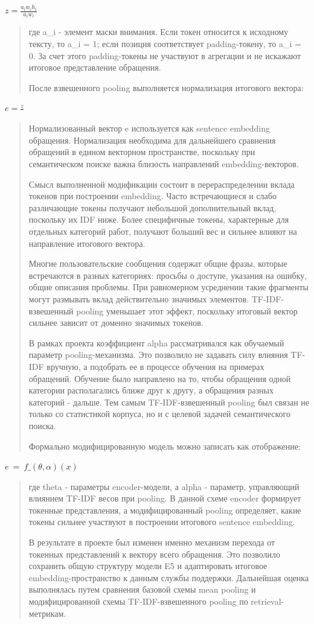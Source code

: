 \documentclass[
]{article}
\begin{document}
\(z = \frac{a_{i}w_{i}h_{i}}{a_{i}w_{i}}\)

\begin{quote}
где a\_i - элемент маски внимания. Если токен относится к исходному
тексту, то a\_i = 1; если позиция соответствует padding-токену, то a\_i
= 0. За счет этого padding-токены не участвуют в агрегации и не искажают
итоговое представление обращения.

После взвешенного pooling выполняется нормализация итогового вектора:
\end{quote}

\(e = \frac{z}{}\)

\begin{quote}
Нормализованный вектор e используется как sentence embedding обращения.
Нормализация необходима для дальнейшего сравнения обращений в едином
векторном пространстве, поскольку при семантическом поиске важна
близость направлений embedding-векторов.

Смысл выполненной модификации состоит в перераспределении вклада токенов
при построении embedding. Часто встречающиеся и слабо различающие токены
получают небольшой дополнительный вклад, поскольку их IDF ниже. Более
специфичные токены, характерные для отдельных категорий работ, получают
больший вес и сильнее влияют на направление итогового вектора.

Многие пользовательские сообщения содержат общие фразы, которые
встречаются в разных категориях: просьбы о доступе, указания на ошибку,
общие описания проблемы. При равномерном усреднении такие фрагменты
могут размывать вклад действительно значимых элементов.
TF-IDF-взвешенный pooling уменьшает этот эффект, поскольку итоговый
вектор сильнее зависит от доменно значимых токенов.

В рамках проекта коэффициент alpha рассматривался как обучаемый параметр
pooling-механизма. Это позволило не задавать силу влияния TF-IDF
вручную, а подобрать ее в процессе обучения на примерах обращений.
Обучение было направлено на то, чтобы обращения одной категории
располагались ближе друг к другу, а обращения разных категорий - дальше.
Тем самым TF-IDF-взвешенный pooling был связан не только со статистикой
корпуса, но и с целевой задачей семантического поиска.

Формально модифицированную модель можно записать как отображение:
\end{quote}

\(e\  = \ f\_(\theta,\alpha)(x)\)

\begin{quote}
где theta - параметры encoder-модели, а alpha - параметр, управляющий
влиянием TF-IDF весов при pooling. В данной схеме encoder формирует
токенные представления, а модифицированный pooling определяет, какие
токены сильнее участвуют в построении итогового sentence embedding.

В результате в проекте был изменен именно механизм перехода от токенных
представлений к вектору всего обращения. Это позволило сохранить общую
структуру модели E5 и адаптировать итоговое embedding-пространство к
данным службы поддержки. Дальнейшая оценка выполнялась путем сравнения
базовой схемы mean pooling и модифицированной схемы TF-IDF-взвешенного
pooling по retrieval-метрикам.
\end{quote}
\end{document}
